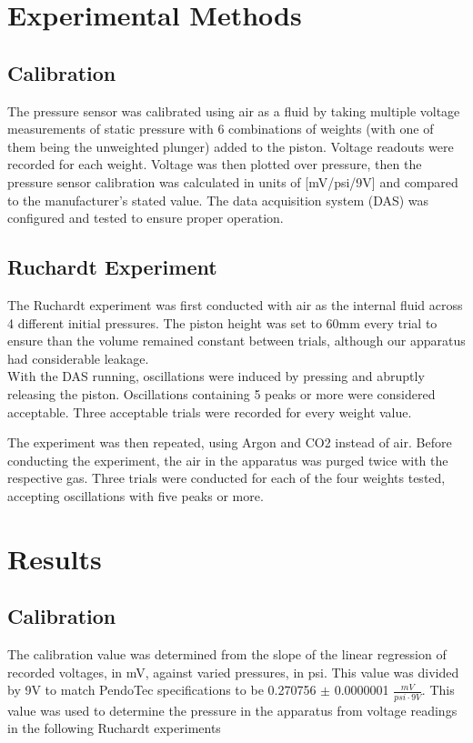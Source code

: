 \documentclass[lettersize,journal]{IEEEtran}
\begin{document}
	
	\section{Experimental Methods}
	\subsection{Calibration}
	The pressure sensor was calibrated using air as a fluid by taking multiple voltage measurements of static pressure with 6 combinations of weights (with one of them being the unweighted plunger) added to the piston. Voltage readouts were recorded for each weight. Voltage was then plotted over pressure, then the pressure sensor calibration was calculated in units of [mV/psi/9V] and compared to the manufacturer's stated value.
	The data acquisition system (DAS) was configured and tested to ensure proper operation.
	\subsection{Ruchardt Experiment}
	The Ruchardt experiment was first conducted with air as the internal fluid across 4 different initial pressures. The piston height was set to 60mm every trial to ensure than the volume remained constant between trials, although our apparatus had considerable leakage. \\With the DAS running, oscillations were induced by pressing and abruptly releasing the piston.
	Oscillations containing 5 peaks or more were considered acceptable. Three acceptable trials were recorded for every weight value.
	
	The experiment was then repeated, using Argon and CO2 instead of air. Before conducting the experiment, the air in the apparatus was purged twice with the respective gas. Three trials were conducted for each of the four weights tested, accepting oscillations with five peaks or more.
	\section{Results}
	\subsection{Calibration}
	The calibration value was determined from the slope of the linear regression of recorded voltages, in mV, against varied pressures, in psi. This value was divided by 9V to match PendoTec specifications  to be 0.270756 $\pm$ 0.0000001 $\frac{mV}{psi\cdot9V}$. This value was used to determine the pressure in the apparatus from voltage readings in the following Ruchardt experiments
	
\end{document}
